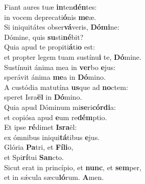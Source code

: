 \evenverse Fiant aures tuæ \textbf{in}ten\textbf{dén}tes:~\*\\
\evenverse in vocem deprecati\textbf{ó}nis \textbf{me}æ.\\
\oddverse Si iniquitátes obser\textbf{vá}veris, \textbf{Dó}\textbf{mi}ne:~\*\\
\oddverse Dómine, quis \textbf{su}sti\textbf{né}bit?\\
\evenverse Quia apud te propiti\textbf{á}ti\textbf{o} est:~\*\\
\evenverse et propter legem tuam sustínu\textbf{i} te, \textbf{Dó}mine.\\
\oddverse Sustínuit ánima mea in \textbf{ver}bo \textbf{e}jus:~\*\\
\oddverse sperávit ánima \textbf{me}a in \textbf{Dó}mino.\\
\evenverse A custódia matutína \textbf{us}que ad \textbf{no}ctem:~\*\\
\evenverse speret Isra\textbf{ël} in \textbf{Dó}mino.\\
\oddverse Quia apud Dóminum mi\textbf{se}ri\textbf{cór}\textbf{di}a:~\*\\
\oddverse et copiósa apud \textbf{e}um re\textbf{dém}ptio.\\
\evenverse Et ipse \textbf{ré}dimet \textbf{Is}\textbf{ra}ël:~\*\\
\evenverse ex ómnibus iniqui\textbf{tá}tibus \textbf{e}jus.\\
\oddverse Glória \textbf{Pa}tri, et \textbf{Fí}\textbf{li}o,~\*\\
\oddverse et Spi\textbf{rí}tui \textbf{San}cto.\\
\evenverse Sicut erat in princípio, et \textbf{nunc}, et \textbf{sem}per,~\*\\
\evenverse et in sǽcula sæcu\textbf{ló}rum. \textbf{A}men.\\

